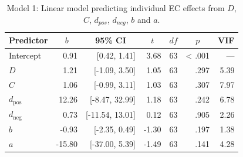 \documentclass[
  man,floatsintext]{apa6}
\begin{document}
\begin{table}[tbp]

\begin{center}
\begin{threeparttable}

\caption{\label{tab:unnamed-chunk-23}Model 1: Linear model predicting individual EC effects from $D$, $C$, $d_{pos}$, $d_{neg}$, $b$ and $a$.}

\begin{tabular}{lrrrrrr}
\toprule
Predictor & \multicolumn{1}{c}{$b$} & \multicolumn{1}{c}{95\% CI} & \multicolumn{1}{c}{$t$} & \multicolumn{1}{c}{$\mathit{df}$} & \multicolumn{1}{c}{$p$} & \multicolumn{1}{c}{VIF}\\
\midrule
Intercept & 0.91 & {}[0.42, 1.41] & 3.68 & 63 & < .001 & ---\\
$D$ & 1.21 & {}[-1.09, 3.50] & 1.05 & 63 & .297 & 5.39\\
$C$ & 1.06 & {}[-0.99, 3.11] & 1.03 & 63 & .307 & 7.97\\
$d_{\mathrm{pos}}$ & 12.26 & {}[-8.47, 32.99] & 1.18 & 63 & .242 & 6.78\\
$d_{\mathrm{neg}}$ & 0.73 & {}[-11.54, 13.01] & 0.12 & 63 & .905 & 2.26\\
$b$ & -0.93 & {}[-2.35, 0.49] & -1.30 & 63 & .197 & 1.38\\
$a$ & -15.80 & {}[-37.00, 5.39] & -1.49 & 63 & .141 & 4.28\\
\bottomrule
\end{tabular}

\end{threeparttable}
\end{center}

\end{table}
\end{document}
